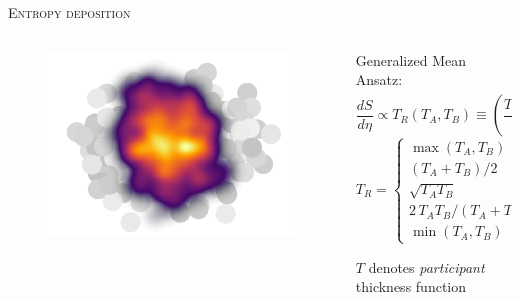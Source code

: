 \documentclass[aspectratio=169]{beamer}
\begin{document}
\begin{frame}[t]{\scshape Entropy deposition}
  \begin{columns}[T]
    \begin{column}{.5\textwidth}
      \begin{figure}
        \includegraphics[width=\textwidth]{trento_entropy}
      \end{figure}
    \end{column}
    \begin{column}{.5\textwidth}
      \bigskip \centering
      \textcolor{theme}{Generalized Mean Ansatz:}
      \begin{equation*}
        \frac{dS}{d\eta} \propto T_R(T_A, T_B) \equiv
        \left(\frac{T_A^p + T_B^p}{2}\right)^{1/p}
      \end{equation*}
      \begin{equation*}
        T_R =
        \begin{cases}
          \max(T_A, T_B) & p \rightarrow +\infty, \\[.5ex]
          (T_A + T_B)/2 & p = +1, \\[.5ex]
          \sqrt{T_A T_B} & p = 0, \\[.5ex]
          2\, T_A T_B/(T_A + T_B) & p = -1, \\[.5ex]
          \min(T_A, T_B) & p \rightarrow -\infty.
        \end{cases}
      \end{equation*}
      \begin{center}
        \smallskip \small $T$ denotes \emph{participant} thickness function
      \end{center}
    \end{column}
  \end{columns}
\end{frame}
\end{document}
